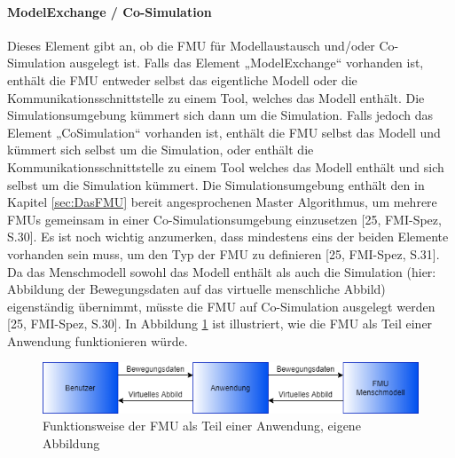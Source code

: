 \paragraph{ModelExchange / Co-Simulation}\label{sec:ModellExchangeCoSimulation}
\noindent Dieses Element gibt an, ob die FMU für Modellaustausch und/oder Co-Simulation ausgelegt ist.
Falls das Element „ModelExchange“ vorhanden ist, enthält die FMU entweder selbst das eigentliche Modell oder die Kommunikationsschnittstelle zu einem Tool, welches das Modell enthält. Die Simulationsumgebung kümmert sich dann um die Simulation.
Falls jedoch das Element „CoSimulation“ vorhanden ist, enthält die FMU selbst das Modell und kümmert sich selbst um die Simulation, oder enthält die Kommunikationsschnittstelle zu einem Tool welches das Modell enthält und sich selbst um die Simulation kümmert. Die Simulationsumgebung enthält den in Kapitel \ref*{sec:DasFMU} bereit angesprochenen Master Algorithmus, um mehrere FMUs gemeinsam in einer Co-Simulationsumgebung einzusetzen  [25, FMI-Spez, S.30].
Es ist noch wichtig anzumerken, dass mindestens eins der beiden Elemente vorhanden sein muss, um den Typ der FMU zu definieren [25, FMI-Spez, S.31].
Da das Menschmodell sowohl das Modell enthält als auch die Simulation (hier: Abbildung der Bewegungsdaten auf das virtuelle menschliche Abbild) eigenständig übernimmt, müsste die FMU auf Co-Simulation ausgelegt werden [25, FMI-Spez, S.30].
\newline
In Abbildung \ref{fig:FMUCoSimulation} ist illustriert, wie die FMU als Teil einer Anwendung funktionieren würde.
\begin{figure}[h]
	\centering
	\includegraphics[width=1\linewidth]{Bilder/A23_FMUCoSimulation}
	\caption{Funktionsweise der FMU als Teil einer Anwendung, eigene Abbildung}
	\label{fig:FMUCoSimulation}
\end{figure}

